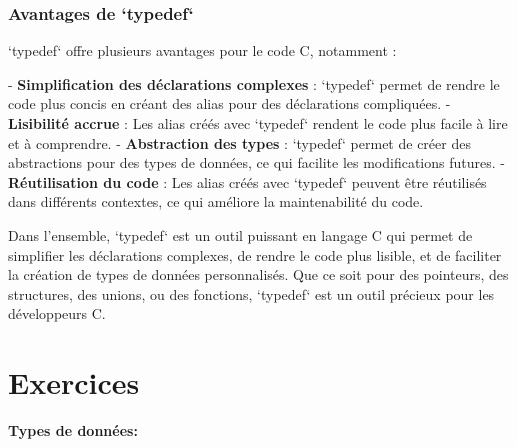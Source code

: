 \subsubsection*{Avantages de `typedef`}

`typedef` offre plusieurs avantages pour le code C, notamment :

- \textbf{Simplification des déclarations complexes} : `typedef` permet de rendre le code plus concis en créant des alias pour des déclarations compliquées.
- \textbf{Lisibilité accrue} : Les alias créés avec `typedef` rendent le code plus facile à lire et à comprendre.
- \textbf{Abstraction des types} : `typedef` permet de créer des abstractions pour des types de données, ce qui facilite les modifications futures.
- \textbf{Réutilisation du code} : Les alias créés avec `typedef` peuvent être réutilisés dans différents contextes, ce qui améliore la maintenabilité du code.

Dans l'ensemble, `typedef` est un outil puissant en langage C qui permet de simplifier les déclarations complexes, de rendre le code plus lisible, et de faciliter la création de types de données personnalisés. Que ce soit pour des pointeurs, des structures, des unions, ou des fonctions, `typedef` est un outil précieux pour les développeurs C.


\section{Exercices}

\textbf{Types de données:}


